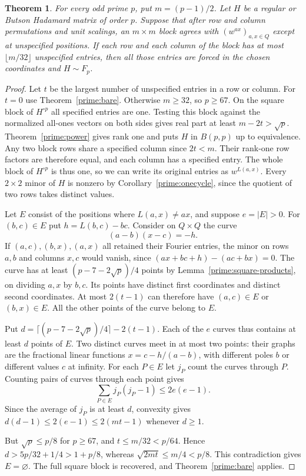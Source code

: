 \documentclass[11pt,a4paper]{article}
\newtheorem{theorem}{Theorem}[section]
\numberwithin{equation}{section}
\begin{document}
\begin{theorem}\label{prime:holes}
For every odd prime $p$, put $m=(p-1)/2$. Let $H$ be a regular or Butson Hadamard matrix of order $p$. Suppose that after row and column permutations and unit scalings, an $m\times m$ block agrees with $(w^{ax})_{a,x\in Q}$ except at unspecified positions. If each row and each column of the block has at most $\lfloor m/32\rfloor$ unspecified entries, then all those entries are forced in the chosen coordinates and $H\sim F_p$.
\end{theorem}
\begin{proof}
Let $t$ be the largest number of unspecified entries in a row or column. For $t=0$ use Theorem~\ref{prime:bare}. Otherwise $m\ge32$, so $p\ge67$. On the square block of $H^{\circ p}$ all specified entries are one. Testing this block against the normalized all-ones vectors on both sides gives real part at least $m-2t>\sqrt p$. Theorem~\ref{prime:power} gives rank one and puts $H$ in $B(p,p)$ up to equivalence. Any two block rows share a specified column since $2t<m$. Their rank-one row factors are therefore equal, and each column has a specified entry. The whole block of $H^{\circ p}$ is thus one, so we can write its original entries as $w^{L(a,x)}$. Every $2\times2$ minor of $H$ is nonzero by Corollary~\ref{prime:onecycle}, since the quotient of two rows takes distinct values.

Let $E$ consist of the positions where $L(a,x)\ne ax$, and suppose $e=|E|>0$. For $(b,c)\in E$ put $h=L(b,c)-bc$. Consider on $Q\times Q$ the curve
$$ (a-b)(x-c)=-h. $$
If $(a,c),(b,x),(a,x)$ all retained their Fourier entries, the minor on rows $a,b$ and columns $x,c$ would vanish, since $(ax+bc+h)-(ac+bx)=0$. The curve has at least $(p-7-2\sqrt p)/4$ points by Lemma~\ref{prime:square-products}, on dividing $a,x$ by $b,c$. Its points have distinct first coordinates and distinct second coordinates. At most $2(t-1)$ can therefore have $(a,c)\in E$ or $(b,x)\in E$. All the other points of the curve belong to $E$.

Put $d=\lceil(p-7-2\sqrt p)/4\rceil-2(t-1)$. Each of the $e$ curves thus contains at least $d$ points of $E$. Two distinct curves meet in at most two points: their graphs are the fractional linear functions $x=c-h/(a-b)$, with different poles $b$ or different values $c$ at infinity. For each $P\in E$ let $j_P$ count the curves through $P$. Counting pairs of curves through each point gives
$$\sum_{P\in E}j_P(j_P-1)\le 2e(e-1).$$
Since the average of $j_P$ is at least $d$, convexity gives $d(d-1)\le 2(e-1)\le 2(mt-1)$ whenever $d\ge1$.

But $\sqrt p\le p/8$ for $p\ge67$, and $t\le m/32<p/64$. Hence $d>5p/32+1/4>1+p/8$, whereas $\sqrt{2mt}\le m/4<p/8$. This contradiction gives $E=\varnothing$. The full square block is recovered, and Theorem~\ref{prime:bare} applies.
\end{proof}
\end{document}
